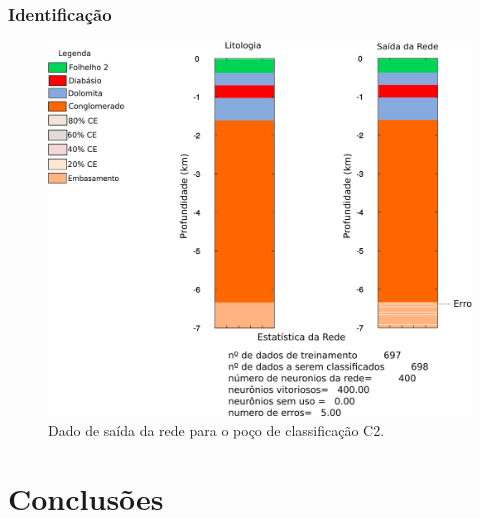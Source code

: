 \documentclass[10pt]{beamer} %
\begin{document}
\begin{frame}
	\frametitle{Identificação}
	\begin{figure}[H]
		\centering
			\includegraphics[scale=0.45]{Imagens/IDC2.png}
		\caption{Dado de saída da rede para o poço de classificação C2.}
		\label{Class C2}
	\end{figure} 
\end{frame}
	



\section{Conclusões}
\end{document}
